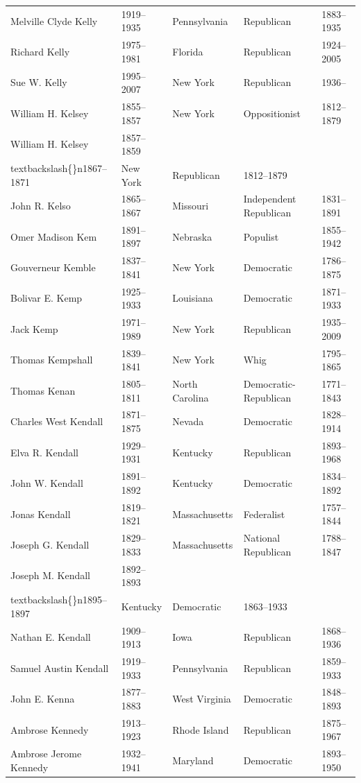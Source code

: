 \documentclass{article}
\begin{document}
\begin{tabular}{lllll}
Melville Clyde Kelly & 1919–1935 & Pennsylvania & Republican & 1883–1935 \\
Richard Kelly & 1975–1981 & Florida & Republican & 1924–2005 \\
Sue W. Kelly & 1995–2007 & New York & Republican & 1936– \\
William H. Kelsey & 1855–1857 & New York & Oppositionist & 1812–1879 \\
William H. Kelsey & 1857–1859\\textbackslash\{\}n1867–1871 & New York & Republican & 1812–1879 \\
John R. Kelso & 1865–1867 & Missouri & Independent Republican & 1831–1891 \\
Omer Madison Kem & 1891–1897 & Nebraska & Populist & 1855–1942 \\
Gouverneur Kemble & 1837–1841 & New York & Democratic & 1786–1875 \\
Bolivar E. Kemp & 1925–1933 & Louisiana & Democratic & 1871–1933 \\
Jack Kemp & 1971–1989 & New York & Republican & 1935–2009 \\
Thomas Kempshall & 1839–1841 & New York & Whig & 1795–1865 \\
Thomas Kenan & 1805–1811 & North Carolina & Democratic-Republican & 1771–1843 \\
Charles West Kendall & 1871–1875 & Nevada & Democratic & 1828–1914 \\
Elva R. Kendall & 1929–1931 & Kentucky & Republican & 1893–1968 \\
John W. Kendall & 1891–1892 & Kentucky & Democratic & 1834–1892 \\
Jonas Kendall & 1819–1821 & Massachusetts & Federalist & 1757–1844 \\
Joseph G. Kendall & 1829–1833 & Massachusetts & National Republican & 1788–1847 \\
Joseph M. Kendall & 1892–1893\\textbackslash\{\}n1895–1897 & Kentucky & Democratic & 1863–1933 \\
Nathan E. Kendall & 1909–1913 & Iowa & Republican & 1868–1936 \\
Samuel Austin Kendall & 1919–1933 & Pennsylvania & Republican & 1859–1933 \\
John E. Kenna & 1877–1883 & West Virginia & Democratic & 1848–1893 \\
Ambrose Kennedy & 1913–1923 & Rhode Island & Republican & 1875–1967 \\
Ambrose Jerome Kennedy & 1932–1941 & Maryland & Democratic & 1893–1950 \\

\end{tabular}
\end{document}
